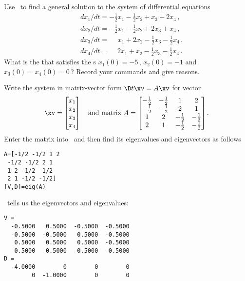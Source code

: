 \begin{example} \label{eg:}
Use \script\ to find a general solution to the system of differential equations
\begin{eqnarray*}
&&dx_1/dt=-\tfrac12x_1-\tfrac12x_2+x_3+2x_4\,, 
\\&&dx_2/dt=-\tfrac12x_1-\tfrac12x_2+2x_3+x_4\,, 
\\&&dx_3/dt=\phantom{+2} x_1+2x_2-\tfrac12x_3-\tfrac12x_4\,,  
\\&&dx_4/dt=\phantom{+}2x_1+x_2-\tfrac12x_3-\tfrac12x_4\,.
\end{eqnarray*}
What is the  that satisfies the s \(x_1(0)=-5\)\,, \(x_2(0)=-1\) and \(x_3(0)=x_4(0)=0\)\,?
Record your commands and give reasons.
\begin{solution} 
Write the system in matrix-vector form \(\D t\xv=A\xv\) for vector 
\begin{equation*}
\xv=\begin{bmatrix} x_1\\x_2\\x_3\\x_4 \end{bmatrix}
\quad\text{and matrix }
A=\begin{bmatrix} -\tfrac12 & -\tfrac12 & 1 & 2
\\-\tfrac12 & -\tfrac12 & 2 & 1
\\1 & 2 & -\tfrac12 & -\tfrac12
\\2 & 1 & -\tfrac12 & -\tfrac12 \end{bmatrix}.
\end{equation*}
Enter the matrix into \script\ and then find its eigenvalues and eigenvectors as follows
\begin{verbatim}
A=[-1/2 -1/2 1 2
 -1/2 -1/2 2 1
 1 2 -1/2 -1/2
 2 1 -1/2 -1/2]
[V,D]=eig(A)
\end{verbatim}
\setbox\ajrqrbox\hbox{}\marginpar{\usebox{\ajrqrbox}}%
\script\ tells us the eigenvectors and eigenvalues:
\begin{verbatim}
V =
  -0.5000   0.5000  -0.5000  -0.5000
  -0.5000  -0.5000   0.5000  -0.5000
   0.5000   0.5000   0.5000  -0.5000
   0.5000  -0.5000  -0.5000  -0.5000
D =
  -4.0000        0        0        0
        0  -1.0000        0        0

\end{verbatim}
\end{solution}
\end{example}
